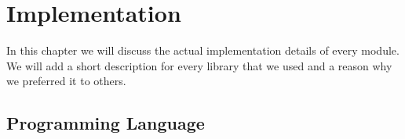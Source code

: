 \chapter{Implementation}

In this chapter we will discuss the actual implementation details of every module. We will add a short description for every library that we used and a reason why we preferred it to others.

\section{Programming Language}


